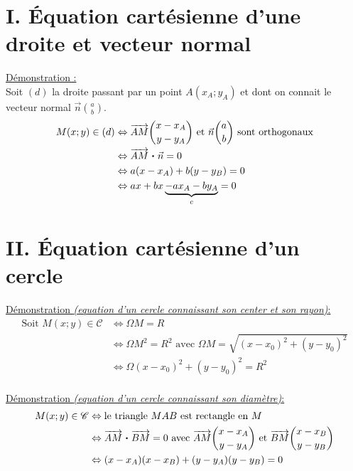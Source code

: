 \documentclass[11pt,a4paper]{article}
\title{\doctitre}
\author{\docniveau \\ \doctheme\text{ - }\doctype}
\date{}
\newcommand{\pdt}{\mathbin{\vcenter{\hbox{\scalebox{0.6}{\textbullet}}}}}
\begin{document}
\maketitle
\pagestyle{custom}
\thispagestyle{custom}

\section*{I. Équation cartésienne d'une droite et vecteur normal}

\underline{Démonstration :} \\
Soit $(d)$ la droite passant par un point $A(x_A;y_A)$ et dont on connait le vecteur normal $\displaystyle\vec{n}\binom{a}{b}$.
\vspace*{-8pt}
\begin{equation*}
  \begin{split}
    M(x;y)\in (d)&\Leftrightarrow \overrightarrow{AM}\binom{x-x_A}{y-y_A} \text{ et } \vec{n}\binom{a}{b} \text{ sont orthogonaux} \\
    &\Leftrightarrow \overrightarrow{AM}\pdt\vec{n} = 0 \\
    &\Leftrightarrow a(x-x_A)+b(y-y_B)=0 \\
    &\Leftrightarrow ax+bx\underbrace{-ax_A-by_A}_{c}=0
  \end{split}
\end{equation*}

\section*{II. Équation cartésienne d'un cercle}

\underline{Démonstration \emph{(equation d'un cercle connaissant son center et son rayon)}:}
\begin{equation*}
  \begin{split}
    \text{Soit } M(x;y) \in \mathscr{C}&\Leftrightarrow\Omega M=R \\
    &\Leftrightarrow\Omega M^2=R^2\text{ avec } \Omega M=\sqrt{(x-x_0)^2+(y-y_0)^2} \\
    &\Leftrightarrow\Omega (x-x_0)^2+(y-y_0)^2=R^2\\
  \end{split}
\end{equation*}

\underline{Démonstration \emph{(equation d'un cercle connaissant son diamètre)}:}
\begin{equation*}
  \begin{split}
    M(x;y)\in\mathscr{C}&\Leftrightarrow\text{le triangle $MAB$ est rectangle en $M$} \\
    &\Leftrightarrow\overrightarrow{AM}\pdt\overrightarrow{BM}=0 \text{ avec } \overrightarrow{AM}\binom{x-x_A}{y-y_A} \text{ et } \overrightarrow{BM}\binom{x-x_B}{y-y_B} \\
    &\Leftrightarrow (x-x_A)(x-x_B)+(y-y_A)(y-y_B)=0
  \end{split}
\end{equation*}
\end{document}
